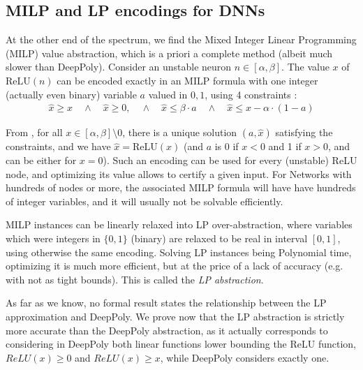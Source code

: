 \documentclass{llncs}
\newcommand{\ReLU}{\mathrm{ReLU}}
\begin{document}

\subsection{MILP and LP encodings for DNNs}

At the other end of the spectrum, we find the Mixed Integer Linear Programming (MILP) value abstraction, which is a priori a complete method (albeit much slower than DeepPoly). 
Consider an unstable neuron $n \in[\alpha,\beta]$. The value $x$ of $\ReLU(n)$ can be encoded exactly in an MILP formula with one integer (actually even binary) variable $a$ valued in ${0,1}$, using 4 constraints \cite{MILP}:
\vspace{-0.1cm}
\begin{align*}
	\hat{x} \geq x \quad \wedge \quad \hat{x} \geq 0, \quad \wedge \quad \hat{x} \leq \beta \cdot a \quad \wedge \quad \hat{x} \leq x-\alpha \cdot (1-a)
\end{align*}

From \cite{MILP}, for all $x \in [\alpha,\beta] \setminus 0$, there is a unique solution $(a,\hat{x})$ satisfying the constraints, and we have $\hat{x}=\ReLU(x)$ (and $a$ is 0 if $x < 0$ and 1 if $x>0$, and can be either for $x=0$). Such an encoding can be used for every (unstable) ReLU node, and optimizing its value allows to certify a given input. 
For Networks with hundreds of nodes or more, the associated MILP formula will have have hundreds of integer variables, and it will usually not be solvable efficiently.

MILP instances can be linearly relaxed into LP over-abstraction, where variables which were integers in $\{0,1\}$ (binary) are relaxed to be real in interval $[0,1]$, using otherwise the same encoding. Solving LP instances being Polynomial time, optimizing it is much more efficient, but at the price of a lack of accuracy (e.g. with not as tight bounds). This is called the {\em LP abstraction}.

As far as we know, no formal result states the relationship between the LP approximation and DeepPoly.
We prove now that the LP abstraction is strictly more accurate than the DeepPoly abstraction, as it actually corresponds to considering in DeepPoly both linear functions lower bounding the ReLU function, $ReLU(x) \geq 0$ and $ReLU(x) \geq x$, while DeepPoly considers exactly one.
\end{document}
